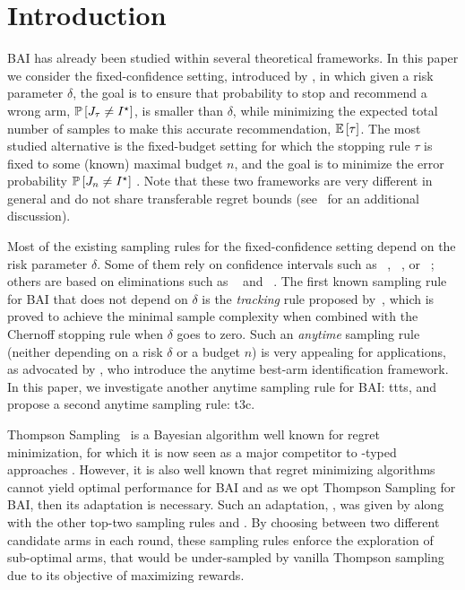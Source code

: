 \section{Introduction}\label{sec:t3c.intro}

BAI has already been studied within several theoretical frameworks. In this paper we consider the fixed-confidence setting, introduced by \cite{even-dar2003confidence}, in which given a risk parameter $\delta$, the goal is to ensure that probability to stop and recommend a wrong arm, $\mathbb{P}\left[J_\tau \neq I^\star\right]$, is smaller than $\delta$, while minimizing the expected total number of samples to make this accurate recommendation, $\mathbb{E}\left[\tau\right]$. The most studied alternative is the fixed-budget setting for which the stopping rule $\tau$ is fixed to some (known) maximal budget $n$, and the goal is to minimize the error probability $\mathbb{P}\left[J_n \neq I^\star\right]$ \citep{audibert2010budget}. Note that these two frameworks are very different in general and do not share transferable regret bounds (see~\citealt{carpentier2016budget} for an additional discussion).

Most of the existing sampling rules for the fixed-confidence setting depend on the risk parameter $\delta$. Some of them rely on confidence intervals such as \LUCB~\citep{kalyanakrishnan2012lucb}, \UGapE~\citep{gabillon2012ugape}, 
or \LIL~\citep{jamieson2014lilucb}; others are based on eliminations such as \SE~\citep{even-dar2003confidence} and \EGE~\citep{karnin2013sha}. The first known sampling rule for BAI that does not depend on $\delta$ is the \emph{tracking} rule proposed by~\cite{garivier2016tracknstop}, which is proved to achieve the minimal sample complexity when combined with the Chernoff stopping rule when $\delta$ goes to zero. Such an \emph{anytime} sampling rule (neither depending on a risk $\delta$ or a budget $n$) is very appealing for applications, as advocated by \cite{jun2016atlucb}, who introduce the anytime best-arm identification framework. In this paper, we investigate another anytime sampling rule for BAI: \gls{ttts}, and propose a second anytime sampling rule: \gls{t3c}.


Thompson Sampling~\citep{thompson1933} is a Bayesian algorithm well known for regret minimization, for which it is now seen as a major competitor to \UCB-typed approaches \citep{burnetas1996optimal,auer2002ucb,cappe2013klucb}. However, it is also well known that regret minimizing algorithms cannot yield optimal performance for BAI \citep{bubeck2011pure,kaufmann2017survey} and as we opt Thompson Sampling for BAI, then its adaptation is necessary. Such an adaptation, \TTTS, was given by \citet{russo2016ttts} along with the other top-two sampling rules \TTPS and \TTVS. By choosing between two different candidate arms in each round, these sampling rules enforce the exploration of sub-optimal arms, that would be under-sampled by vanilla Thompson sampling due to its objective of maximizing rewards.

